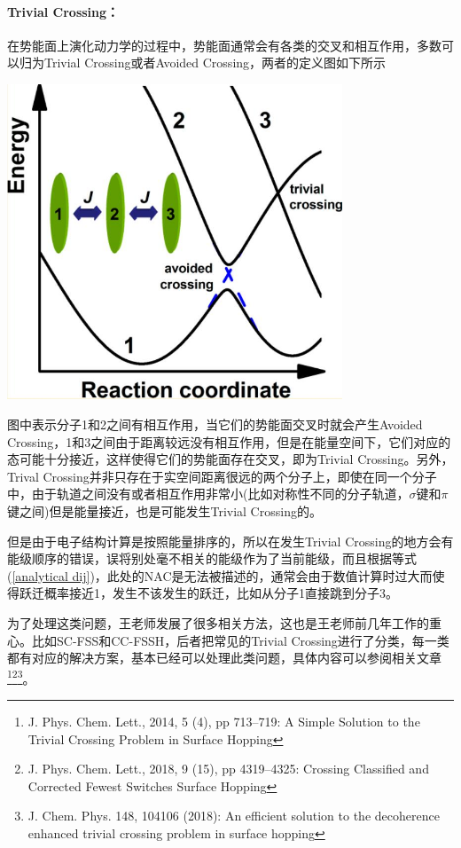 \documentclass{article}
\numberwithin{equation}{section}
\begin{document}
        \paragraph{Trivial Crossing：}在势能面上演化动力学的过程中，势能面通常会有各类的交叉和相互作用，多数可以归为Trivial Crossing或者Avoided Crossing，两者的定义图如下所示
        \begin{center}
          \includegraphics[width = 10cm]{fig/crossing.jpg}
        \end{center}
        图中表示分子1和2之间有相互作用，当它们的势能面交叉时就会产生Avoided Crossing，1和3之间由于距离较远没有相互作用，但是在能量空间下，它们对应的态可能十分接近，这样使得它们的势能面存在交叉，即为Trivial Crossing。另外，Trival Crossing并非只存在于实空间距离很远的两个分子上，即使在同一个分子中，由于轨道之间没有或者相互作用非常小(比如对称性不同的分子轨道，$\sigma$键和$\pi$键之间)但是能量接近，也是可能发生Trivial Crossing的。

        但是由于电子结构计算是按照能量排序的，所以在发生Trivial Crossing的地方会有能级顺序的错误，误将别处毫不相关的能级作为了当前能级，而且根据等式(\ref{analytical dij})，此处的NAC是无法被描述的，通常会由于数值计算时过大而使得跃迁概率接近1，发生不该发生的跃迁，比如从分子1直接跳到分子3。

        为了处理这类问题，王老师发展了很多相关方法，这也是王老师前几年工作的重心。比如SC-FSS和CC-FSSH，后者把常见的Trivial Crossing进行了分类，每一类都有对应的解决方案，基本已经可以处理此类问题，具体内容可以参阅相关文章\footnote{J. Phys. Chem. Lett., 2014, 5 (4), pp 713–719: A Simple Solution to the Trivial Crossing Problem in Surface Hopping}\footnote{J. Phys. Chem. Lett., 2018, 9 (15), pp 4319–4325: Crossing Classified and Corrected Fewest Switches Surface Hopping}\footnote{J. Chem. Phys. 148, 104106 (2018): An efficient solution to the decoherence enhanced trivial crossing problem in surface hopping}。
\end{document}
